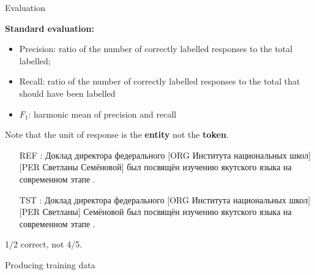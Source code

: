\documentclass[10pt, compress]{beamer}
\begin{document}
\begin{frame}{Evaluation}

\textbf{Standard evaluation:}
\begin{itemize}
  \item Precision: ratio of the number of correctly labelled responses to the total labelled;
  \item Recall:  ratio of the number of correctly labelled responses to the total that should have been labelled
  \item $F_1$: harmonic mean of precision and recall
\end{itemize}


Note that the unit of response is the \textbf{entity} not the \textbf{token}.

\begin{itemize}
  \item[REF]: Доклад директора федерального \alert<2>{[ORG Института национальных школ] [PER Светланы Семёновой]} был посвящён изучению якутского языка на современном этапе .
  \item[TST]: Доклад директора федерального \alert<2>{[ORG Института национальных школ] [PER Светланы]} Семёновой был посвящён изучению якутского языка на современном этапе .
\end{itemize}

1/2 correct, not 4/5.

\end{frame}

\begin{frame}[standout]
Producing training data



\end{frame}
\end{document}
